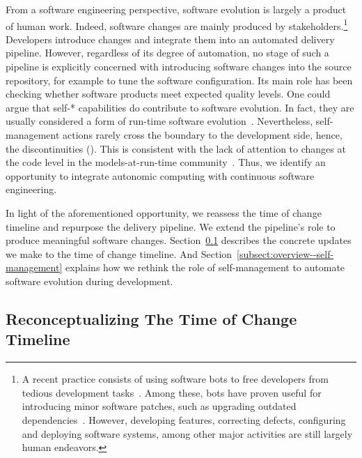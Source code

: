 From a software engineering perspective, software evolution is largely a product of human work. Indeed, software changes are mainly produced by stakeholders.\footnote{A recent practice consists of using software bots to free developers from tedious development tasks~\cite{storey-2016-disrupting}. Among these, bots have proven useful for introducing minor software patches, such as upgrading outdated dependencies~\cite{erlenhov-2020-empirical}. However, developing features, correcting defects, configuring and deploying software systems, among other major activities are still largely human endeavors.} Developers introduce changes and integrate them into an automated delivery pipeline. However, regardless of its degree of automation, no stage of such a pipeline is explicitly concerned with introducing software changes into the source repository, for example to tune the software configuration. Its main role has been checking whether software products meet expected quality levels. One could argue that self-* capabilities do contribute to software evolution. In fact, they are usually considered a form of run-time software evolution~\cite{muller-2014-highly}. Nevertheless, self-management actions rarely cross the boundary to the development side, hence, the discontinuities (). This is consistent with the lack of attention to changes at the code level in the models-at-run-time community~\cite{bencomo-2019-models}. Thus, we identify an opportunity to integrate autonomic computing with continuous software engineering.

In light of the aforementioned opportunity, we reassess the time of change timeline and repurpose the delivery pipeline. We extend the pipeline's role to produce meaningful software changes. Section~\ref{subsect:overview--time-of-change-timeline} describes the concrete updates we make to the time of change timeline. And Section~\ref{subsect:overview--self-management} explains how we rethink the role of self-management to automate software evolution during development.

\subsection{Reconceptualizing The Time of Change Timeline}
\label{subsect:overview--time-of-change-timeline}

